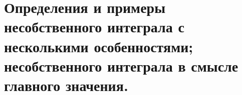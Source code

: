 \documentclass[../main.tex]{subfiles}
\begin{document}
\newpage
\section{Определения и примеры несобственного интеграла с несколькими особенностями; несобственного интеграла в смысле главного значения.}
\end{document}
